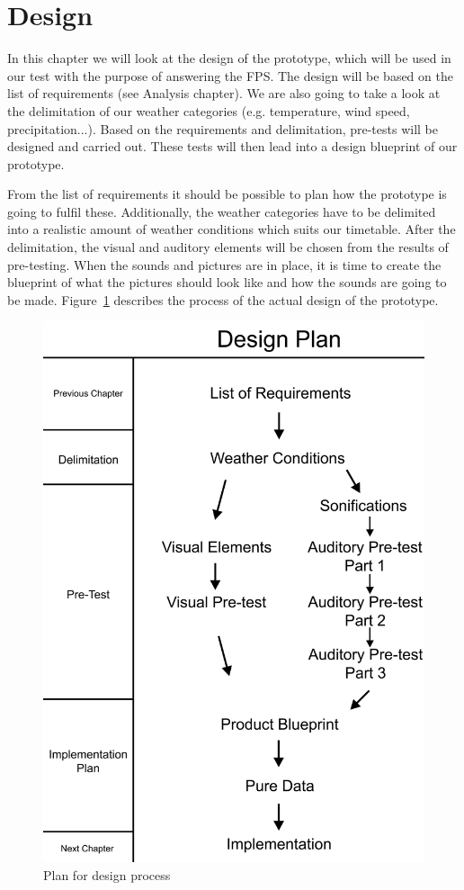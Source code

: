 
\section{Design} %
\label{sec:design}

In this chapter we will look at the design of the prototype, which will be used in our test with the purpose of answering the FPS. 
The design will be based on the list of requirements (see Analysis chapter). 
We are also going to take a look at the delimitation of our weather categories (e.g. temperature, wind speed, precipitation...). 
Based on the requirements and delimitation, pre-tests will be designed and carried out. 
These tests will then lead into a design blueprint of our prototype.

From the list of requirements it should be possible to plan how the prototype is going to fulfil these. 
Additionally, the weather categories have to be delimited into a realistic amount of weather conditions which suits our timetable. 
After the delimitation, the visual and auditory elements will be chosen from the results of pre-testing. 
When the sounds and pictures are in place, it is time to create the blueprint of what the pictures should look like and how the sounds are going to be made. 
Figure~\ref{fig:design1} describes the process of the actual design of the prototype.

\begin{figure}[!htbp]
    \centering
    \includegraphics[width=.5\textwidth]{images/Design1.jpg}
    \caption{Plan for design process}
    \label{fig:design1}
\end{figure}


